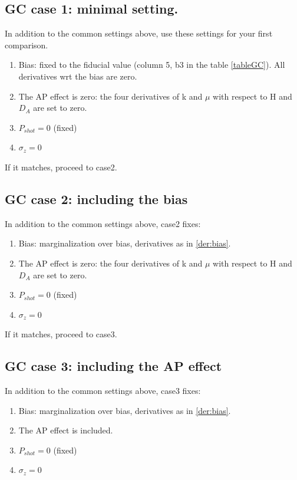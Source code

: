 \subsection*{GC case 1: minimal setting.}
In addition to the common settings above, use these settings for your first comparison.
\begin{enumerate}
\item  Bias: fixed to the fiducial value (column 5, b3 in the table \ref{tableGC}). All derivatives wrt the bias are zero.
\item The AP effect is zero: the four derivatives of k and $\mu$ with respect to H and $D_A$ are set to zero.
\item $P_{shot} = 0$ (fixed)
\item $\sigma_z = 0$
\end{enumerate}

If it matches, proceed to case2.

\subsection*{GC case 2: including the bias}
In addition to the common settings above, case2 fixes:
\begin{enumerate}
\item  Bias: marginalization over bias, derivatives as in \ref{der:bias}.
\item The AP effect is zero: the four derivatives of k and $\mu$ with respect to H and $D_A$ are set to zero.
\item $P_{shot} = 0$ (fixed)
\item $\sigma_z = 0$
\end{enumerate}


If it matches, proceed to case3.

\subsection*{GC case 3: including the AP effect}
In addition to the common settings above, case3 fixes:
\begin{enumerate}
\item  Bias: marginalization over bias, derivatives as in \ref{der:bias}.
\item The AP effect is included. 
\item $P_{shot} = 0$ (fixed)
\item $\sigma_z = 0$
\end{enumerate}

